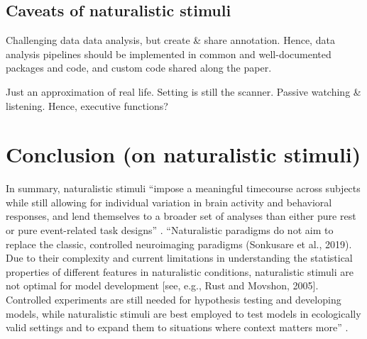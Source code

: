 \subsection{Caveats of naturalistic stimuli}

%
Challenging data data analysis, but create \& share annotation.
%
Hence, data analysis pipelines should be implemented in common and
well-documented packages and code, and custom code shared along the paper.

%
Just an approximation of real life.
%
Setting is still the scanner.
%
Passive watching \& listening. Hence, executive functions?


\section{Conclusion (on naturalistic stimuli)}
%
In summary, naturalistic stimuli ``impose a meaningful timecourse across
subjects while still allowing for individual variation in brain activity and
behavioral responses, and lend themselves to a broader set of analyses than
either pure rest or pure event-related task designs'' \citep{finn2017can}.
%
``Naturalistic paradigms do not aim to replace the classic, controlled
neuroimaging paradigms (Sonkusare et al., 2019). Due to their complexity and
current limitations in understanding the statistical properties of different
features in naturalistic conditions, naturalistic stimuli are not optimal for
model development [see, e.g., Rust and Movshon, 2005]. Controlled experiments
are still needed for hypothesis testing and developing models, while
naturalistic stimuli are best employed to test models in ecologically valid
settings and to expand them to situations where context matters
more'' \citep{saarimaki2021naturalistic}.
